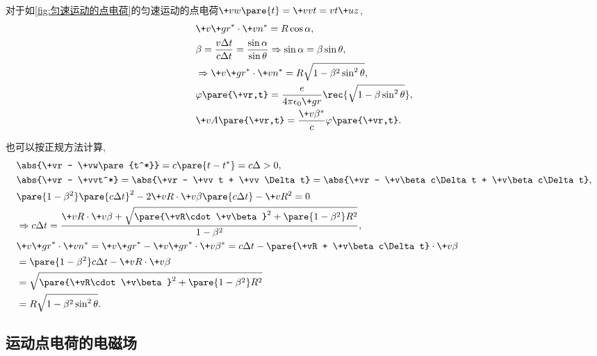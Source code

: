 \documentclass[hidelinks]{ctexart}
\begin{document}
\begin{sample}
    \begin{ex}
        对于如\cref{fig:匀速运动的点电荷}的匀速运动的点电荷$\+vw\pare{t} = \+vv t = vt\+uz$,
        \begin{align*}
            & \+v{\+gr}^* \cdot \+vn^* = R\cos \alpha, \\
            & \beta = \frac{v\Delta t}{c\Delta t} = \frac{\sin \alpha}{\sin\theta} \Rightarrow \sin \alpha = \beta \sin\theta, \\
            & \Rightarrow \+v{\+gr}^* \cdot \+vn^* = R\sqrt{1-\beta^2\sin^2\theta}, \\
            & \varphi\pare{\+vr,t} = \frac{e}{4\pi\epsilon_0 \+gr} \rec{\sqrt{1-\beta \sin^2\theta}}, \\
            & \+vA\pare{\+vr,t} = \frac{\+v\beta^*}{c}\varphi\pare{\+vr,t}.
        \end{align*}
    \end{ex}
    \begin{ex}
        也可以按正规方法计算,
        \begin{align*}
            & \abs{\+vr - \+vw\pare{t^*}} = c\pare{t-t^*} = c\Delta > 0, \\
            & \abs{\+vr - \+vvt^*} = \abs{\+vr - \+vv t + \+vv \Delta t} = \abs{\+vr - \+v\beta c\Delta t + \+v\beta c\Delta t}, \\
            & \pare{1-\beta^2}\pare{c\Delta t}^2 - 2\+vR\cdot \+v\beta\pare{c\Delta t} - \+vR^2 = 0 \\
            & \Rightarrow c\Delta t = \frac{\+vR\cdot \+v\beta + \sqrt{\pare{\+vR\cdot \+v\beta}^2 + \pare{1-\beta^2}R^2}}{1-\beta^2}, \\
            & \+v{\+gr}^* \cdot \+vn^* = \+v{\+gr}^* - \+v{\+gr}^*\cdot \+v\beta^* = c\Delta t - \pare{\+vR + \+v\beta c\Delta t}\cdot \+v\beta \\
            & = \pare{1-\beta^2}c\Delta t - \+vR \cdot \+v\beta \\
            &= \sqrt{\pare{\+vR\cdot \+v\beta}^2 + \pare{1-\beta^2}R^2} \\
            &= R \sqrt{1-\beta^2 \sin^2\theta}.
        \end{align*}
    \end{ex}
\end{sample}



\subsection{运动点电荷的电磁场} %
\label{sub:运动点电荷的电磁场}
\end{document}
